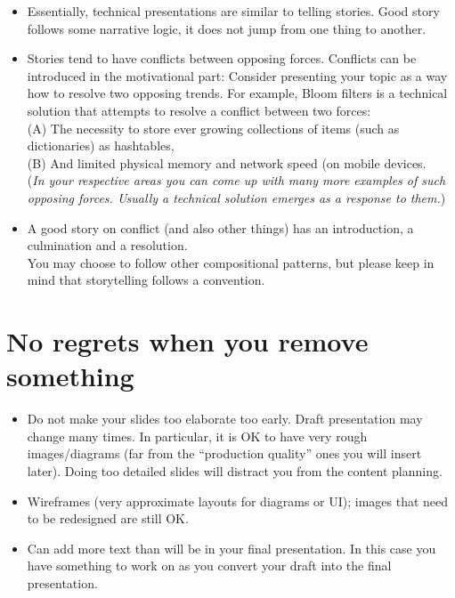 \documentclass[jou]{apa6}
\begin{document}
\begin{itemize}
\item Essentially, technical presentations are similar to telling stories. 
Good story follows some narrative logic, it does not jump from one thing to another. 
\item Stories tend to have conflicts between opposing forces.
Conflicts can be introduced in the motivational part: Consider presenting your 
topic as a way how to resolve two opposing trends. For example, Bloom filters
is a technical solution that attempts to resolve a conflict between two forces:\\
(A) The necessity to store ever growing collections of items (such as dictionaries) as hashtables,\\
(B) And limited physical memory  and network speed (on mobile devices.\\
({\em In your respective areas you can come up with many more examples of such opposing forces. 
Usually a technical solution emerges as a response to them.})
\item A good story on conflict (and also other things) 
has an introduction, a culmination and a resolution.\\
You may choose to follow other compositional patterns, but please keep in mind that
storytelling follows a convention.
\end{itemize}





\section{No regrets when you remove something}

\begin{itemize}
\item Do not make your slides too elaborate too early. Draft presentation may change many times.
In particular, it is OK to have very rough images/diagrams 
(far from the ``production quality'' ones you will insert later).
Doing too detailed slides will distract you from the content planning. 
\item Wireframes (very approximate layouts for diagrams or UI); images that 
need to be redesigned are still OK.
\item Can add more text than will be in your final presentation. 
In this case you have something to work on as you convert 
your draft into the final presentation.
\end{itemize}
\end{document}
